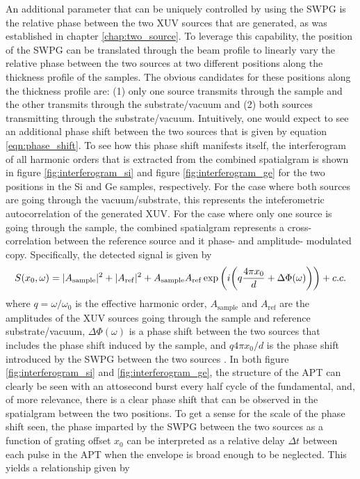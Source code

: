 An additional parameter that can be uniquely controlled by using the SWPG is the relative phase between the two XUV sources that are generated, as was established in chapter \ref{chap:two_source}. To leverage this capability, the position of the SWPG can be translated through the beam profile to linearly vary the relative phase between the two sources at two different positions along the thickness profile of the samples.  The obvious candidates for these positions along the thickness profile are: (1) only one source transmits through the sample and the other transmits through the substrate/vacuum and (2) both sources transmitting through the substrate/vacuum.  Intuitively, one would expect to see an additional phase shift between the two sources that is given by equation \ref{eqn:phase_shift}.  To see how this phase shift manifests itself, the interferogram of all harmonic orders that is extracted from the combined spatialgram is shown in figure \ref{fig:interferogram_si} and figure \ref{fig:interferogram_ge} for the two positions in the Si and Ge samples, respectively.  For the case where both sources are going through the vacuum/substrate, this represents the inteferometric autocorrelation of the generated XUV.  For the case where only one source is going through the sample, the combined spatialgram represents a cross-correlation between the reference source and it phase- and amplitude- modulated copy.  Specifically, the detected signal is given by 
\begin{equation}
\label{eqn:combined_spatialgram_theory}
	S(x_0,\omega) = \lvert A_{\mathrm{sample}} \rvert^2 + \lvert A_{\mathrm{ref}} \rvert^2 + A_{\mathrm{sample}}A_{\mathrm{ref}}\exp\bigg(i\bigg(q\frac{4\pi x_0}{d} + \Delta\Phi(\omega)\bigg)\bigg) + c.c.
\end{equation}
where $q=\omega/\omega_0$ is the effective harmonic order, $A_{\mathrm{sample}}$ and $A_{\mathrm{ref}}$ are the amplitudes of the XUV sources going through the sample and reference substrate/vacuum, $\Delta\Phi(\omega)$ is a phase shift between the two sources that includes the phase shift induced by the sample, and $q4\pi x_0/d$ is the phase shift introduced by the SWPG between the two sources \cite{jansenBroadbandExtremeUltraviolet2019}.  In both figure \ref{fig:interferogram_si} and \ref{fig:interferogram_ge}, the structure of the APT can clearly be seen with an attosecond burst every half cycle of the fundamental, and, of more relevance, there is a clear phase shift that can be observed in the spatialgram between the two positions.  To get a sense for the scale of the phase shift seen, the phase imparted by the SWPG between the two sources as a function of grating offset $x_0$ can be interpreted as a relative delay $\Delta t$ between each pulse in the APT when the envelope is broad enough to be neglected.  This yields a relationship given by
